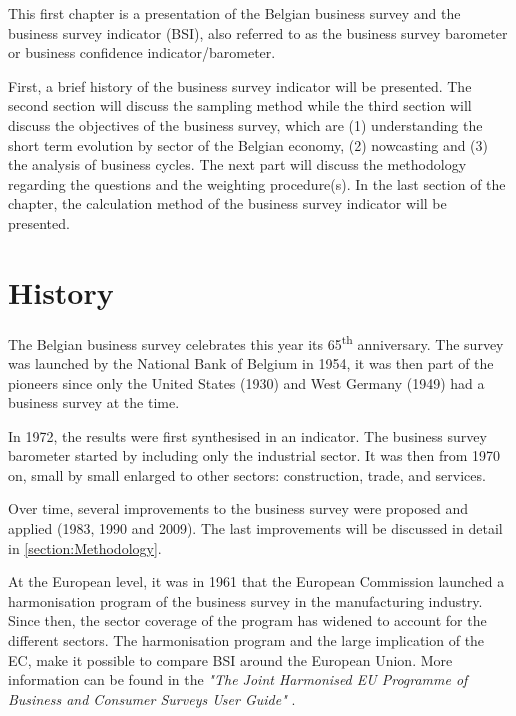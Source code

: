 \documentclass[12pt,a4paper,oneside]{book}
\begin{document}
This first chapter is a presentation of the Belgian business survey and the business survey indicator (BSI), also referred to as the business survey barometer or business confidence indicator/barometer.

First, a brief history of the business survey indicator will be presented.
The second section will discuss the sampling method while the third section will discuss the objectives of the business survey, which are (1) understanding the short term evolution by sector of the Belgian economy, (2) nowcasting and (3) the analysis of business cycles.
The next part will discuss the methodology regarding the questions and the weighting procedure(s).
In the last section of the chapter, the calculation method of the business survey indicator will be presented.


\section{History}

The Belgian business survey celebrates this year its 65\textsuperscript{th} anniversary. The survey was launched by the National Bank of Belgium in 1954, it was then part of the pioneers since only the United States (1930) and West Germany (1949) had a business survey at the time.

In 1972, the results were first synthesised in an indicator.
The business survey barometer started by including only the industrial sector. It was then from 1970 on, small by small enlarged to other sectors: construction, trade, and services. 

Over time, several improvements to the business survey were proposed and applied (1983, 1990 and 2009). The last improvements will be discussed in detail in \autoref{section:Methodology}.

At the European level, it was in 1961 that the European Commission launched a harmonisation program of the business survey in the manufacturing industry. 
Since then, the sector coverage of the program has widened to account for the different sectors.
The harmonisation program and the large implication of the EC, make it possible to compare BSI around the European Union.
More information can be found in the \textit{"The Joint Harmonised EU Programme of Business and Consumer Surveys User Guide"} \cite{european_commission_joint_2016}.
\end{document}
